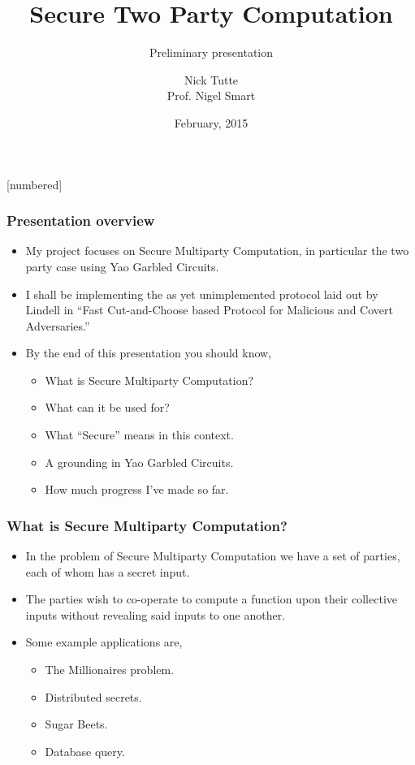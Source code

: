 \documentclass{beamer}
\begin{document}
	\title[Crisis]{Secure Two Party Computation}
	\subtitle{Preliminary presentation}
	\author[Author]{Nick Tutte\\[1ex]{\tiny Prof. Nigel Smart}}
	\date[Feb 2015]
	{February, 2015}
	\subject{Computer Science}
	\frame{\titlepage}
	[numbered]


	\begin{frame}
		\frametitle{Presentation overview}
		\begin{itemize}
			\item My project focuses on Secure Multiparty Computation, in particular the two party case using Yao Garbled Circuits.
			\item I shall be implementing the as yet unimplemented protocol laid out by Lindell in ``Fast Cut-and-Choose based Protocol for Malicious and Covert Adversaries.''

			\item By the end of this presentation you should know,
			\begin{itemize}
				\item What is Secure Multiparty Computation?
				\item What can it be used for?
				\item What ``Secure'' means in this context.
				\item A grounding in Yao Garbled Circuits.
				\item How much progress I've made so far.
			\end{itemize}
		\end{itemize}

	\end{frame}


	\begin{frame}
		\frametitle{What is Secure Multiparty Computation?}
		
		\begin{itemize}
			\item In the problem of Secure Multiparty Computation we have a set of parties, each of whom has a secret input.
			\item The parties wish to co-operate to compute a function upon their collective inputs without revealing said inputs to one another.
			\item Some example applications are,
			\begin{itemize}
				\item The Millionaires problem.
				\item Distributed secrets.
				\item Sugar Beets.
				\item Database query.
			\end{itemize}
		\end{itemize}
	\end{frame}
\end{document}
